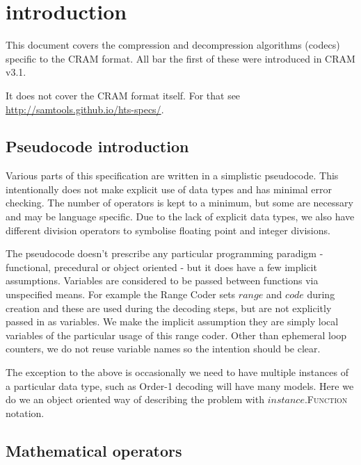 \documentclass[a4paper]{article}
\begin{document}
\section{introduction}

This document covers the compression and decompression algorithms
(codecs) specific to the CRAM format.  All bar the first of these were
introduced in CRAM v3.1.

It does not cover the CRAM format itself.  For that see \url{http://samtools.github.io/hts-specs/}.

\subsection{Pseudocode introduction}

Various parts of this specification are written in a simplistic
pseudocode.  This intentionally does not make explicit use of data
types and has minimal error checking.  The number of operators is kept
to a minimum, but some are necessary and may be language specific.
Due to the lack of explicit data types, we also have different
division operators to symbolise floating point and integer divisions.

The pseudocode doesn't prescribe any particular programming paradigm -
functional, precedural or object oriented - but it does have a few
implicit assumptions.  Variables are considered to be passed between
functions via unspecified means.  For example the Range Coder sets
$range$ and $code$ during creation and these are used during the
decoding steps, but are not explicitly passed in as variables.  We
make the implicit assumption they are simply local variables of the
particular usage of this range coder.  Other than ephemeral loop
counters, we do not reuse variable names so the intention should be
clear.

The exception to the above is occasionally we need to have multiple
instances of a particular data type, such as Order-1 decoding will
have many models.  Here we do we an object oriented way of describing
the problem with $instance$.\textsc{Function} notation.

\subsection{Mathematical operators}
\end{document}
